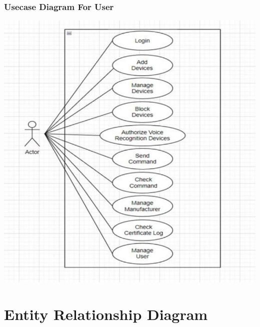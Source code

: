 \subsubsection{Usecase Diagram For User}
\includegraphics[scale=0.7]{Diag/usecaseadmin.png}

\label{fig:Use case diagram For User}






%




\section{Entity Relationship Diagram}

